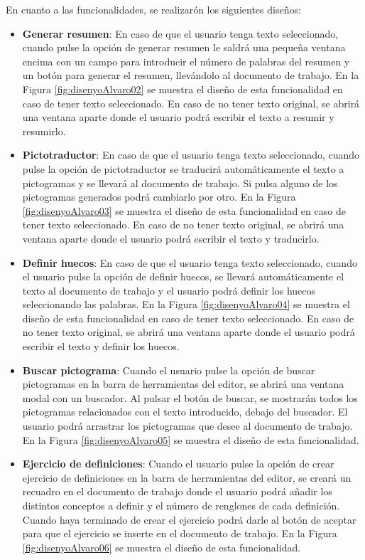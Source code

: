 En cuanto a las funcionalidades, se realizarón los siguientes diseños:
\begin{itemize}
  \item \textbf{Generar resumen}: En caso de que el usuario tenga texto seleccionado, cuando pulse la opción de generar resumen le saldrá una pequeña ventana encima con un campo para introducir el número de palabras del resumen y un botón para generar el resumen, llevándolo al documento de trabajo. En la Figura \ref{fig:disenyoAlvaro02} se muestra el diseño de esta funcionalidad en caso de tener texto seleccionado. En caso de no tener texto original, se abrirá una ventana aparte donde el usuario podrá escribir el texto a resumir y resumirlo.
  \item \textbf{Pictotraductor}: En caso de que el usuario tenga texto seleccionado, cuando pulse la opción de pictotraductor se traducirá automáticamente el texto a pictogramas y se llevará al documento de trabajo. Si pulsa alguno de los pictogramas generados podrá cambiarlo por otro. En la Figura \ref{fig:disenyoAlvaro03} se muestra el diseño de esta funcionalidad en caso de tener texto seleccionado. En caso de no tener texto original, se abrirá una ventana aparte donde el usuario podrá escribir el texto y traducirlo.
  \item \textbf{Definir huecos}: En caso de que el usuario tenga texto seleccionado, cuando el usuario pulse la opción de definir huecos, se llevará automáticamente el texto al documento de trabajo y el usuario podrá definir los huecos seleccionando las palabras. En la Figura \ref{fig:disenyoAlvaro04} se muestra el diseño de esta funcionalidad en caso de tener texto seleccionado. En caso de no tener texto original, se abrirá una ventana aparte donde el usuario podrá escribir el texto y definir los huecos.
  \item \textbf{Buscar pictograma}: Cuando el usuario pulse la opción de buscar pictogramas en la barra de herramientas del editor, se abrirá una ventana modal con un buscador. Al pulsar el botón de buscar, se mostrarán todos los pictogramas relacionados con el texto introducido, debajo del buscador. El usuario podrá arrastrar los pictogramas que desee al documento de trabajo. En la Figura \ref{fig:disenyoAlvaro05} se muestra el diseño de esta funcionalidad.
  \item \textbf{Ejercicio de definiciones}: Cuando el usuario pulse la opción de crear ejercicio de definiciones en la barra de herramientas del editor, se creará un recuadro en el documento de trabajo donde el usuario podrá añadir los distintos conceptos a definir y el número de renglones de cada definición. Cuando haya terminado de crear el ejercicio podrá darle al botón de aceptar para que el ejercicio se inserte en el documento de trabajo. En la Figura \ref{fig:disenyoAlvaro06} se muestra el diseño de esta funcionalidad.

\end{itemize}
